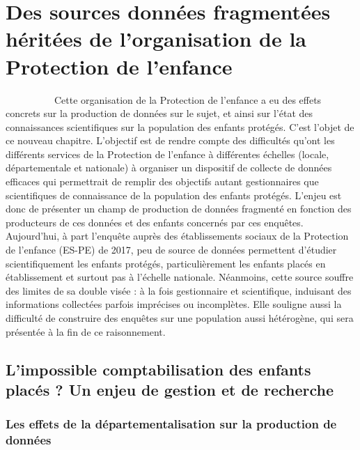 \documentclass[
  12,
  a4paper,
]{report}
\begin{document}
\newpage

\hypertarget{des-sources-donnuxe9es-fragmentuxe9es-huxe9rituxe9es-de-lorganisation-de-la-protection-de-lenfance}{%
\chapter{Des sources données fragmentées héritées de l'organisation de
la Protection de
l'enfance}\label{des-sources-donnuxe9es-fragmentuxe9es-huxe9rituxe9es-de-lorganisation-de-la-protection-de-lenfance}}

~~~~~~~~~~Cette organisation de la Protection de l'enfance a eu des
effets concrets sur la production de données sur le sujet, et ainsi sur
l'état des connaissances scientifiques sur la population des enfants
protégés. C'est l'objet de ce nouveau chapitre. L'objectif est de rendre
compte des difficultés qu'ont les différents services de la Protection
de l'enfance à différentes échelles (locale, départementale et
nationale) à organiser un dispositif de collecte de données efficaces
qui permettrait de remplir des objectifs autant gestionnaires que
scientifiques de connaissance de la population des enfants protégés.
L'enjeu est donc de présenter un champ de production de données
fragmenté en fonction des producteurs de ces données et des enfants
concernés par ces enquêtes. Aujourd'hui, à part l'enquête auprès des
établissements sociaux de la Protection de l'enfance (ES-PE) de 2017,
peu de source de données permettent d'étudier scientifiquement les
enfants protégés, particulièrement les enfants placés en établissement
et surtout pas à l'échelle nationale. Néanmoins, cette source souffre
des limites de sa double visée : à la fois gestionnaire et scientifique,
induisant des informations collectées parfois imprécises ou incomplètes.
Elle souligne aussi la difficulté de construire des enquêtes sur une
population aussi hétérogène, qui sera présentée à la fin de ce
raisonnement.

\hypertarget{limpossible-comptabilisation-des-enfants-placuxe9s-un-enjeu-de-gestion-et-de-recherche}{%
\section{L'impossible comptabilisation des enfants placés ? Un enjeu de
gestion et de
recherche}\label{limpossible-comptabilisation-des-enfants-placuxe9s-un-enjeu-de-gestion-et-de-recherche}}

\hypertarget{les-effets-de-la-duxe9partementalisation-sur-la-production-de-donnuxe9es}{%
\subsection{Les effets de la départementalisation sur la production de
données}\label{les-effets-de-la-duxe9partementalisation-sur-la-production-de-donnuxe9es}}
\end{document}
